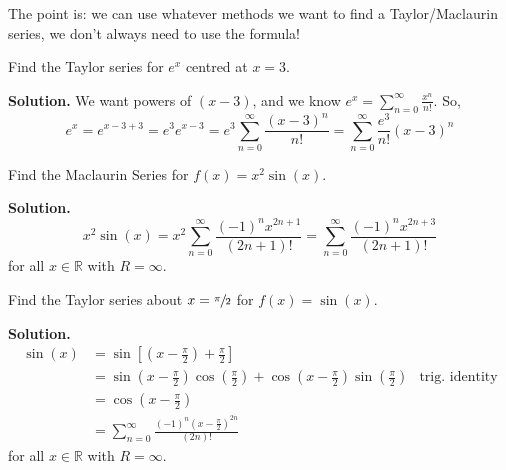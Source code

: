 The point is: we can use whatever methods we want to find a Taylor/Maclaurin
series, we don't always need to use the formula!

\begin{Example}{}{}
    Find the Taylor series for $ e^x $ centred at $ x=3 $.

    \textbf{Solution.} We want powers of $ (x-3) $,
    and we know $ \displaystyle e^x=\sum\limits_{n=0}^{\infty} \frac{x^n}{n!} $. So,
    \[ e^x=e^{x-3+3}=e^3 e^{x-3}
        =e^3 \sum\limits_{n=0}^{\infty} \frac{(x-3)^n}{n!}
        =\sum\limits_{n=0}^{\infty} \frac{e^3}{n!}(x-3)^n \]
\end{Example}

\begin{Example}{}{}
    Find the Maclaurin Series for $ f(x)=x^2\sin(x) $.

    \textbf{Solution.}
    \[ x^2\sin(x)=x^2
        \sum\limits_{n=0}^{\infty} \frac{(-1)^n x^{2n+1}}{(2n+1)!}
        =\sum\limits_{n=0}^{\infty} \frac{(-1)^n x^{2n+3}}{(2n+1)!} \]
    for all $ x\in\mathbb{R} $ with $ R=\infty $.
\end{Example}

\begin{Example}{}{}
    Find the Taylor series about $ x=\sfrac{\pi}{2} $ for $ f(x)=\sin(x) $.

    \textbf{Solution.}
    \begin{align*}
        \sin(x) & = \sin\left[ \left(x-\frac{\pi}{2}\right)+\frac{\pi}{2} \right]                                                                                                   \\
                & =\sin\left( x-\frac{\pi}{2}  \right)\cos\left( \frac{\pi}{2} \right) +\cos\left( x-\frac{\pi}{2} \right)\sin\left( \frac{\pi}{2} \right) & \text{trig.\ identity} \\
                & =\cos\left( x-\frac{\pi}{2} \right)                                                                                                                               \\
                & =\sum\limits_{n=0}^{\infty} \frac{(-1)^n \left( x-\frac{\pi}{2} \right)^{2n}}{(2n)!}
    \end{align*}
    for all $ x\in\mathbb{R} $ with $ R=\infty $.
\end{Example}

